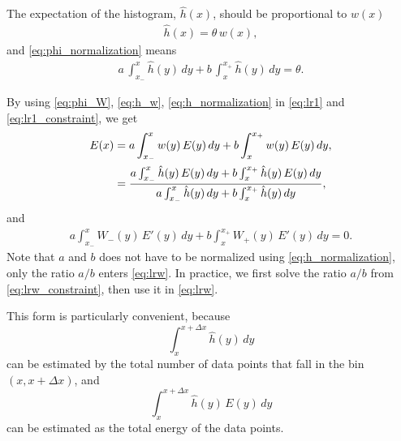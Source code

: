 \documentclass[12pt]{article}
\begin{document}
The expectation of the histogram, $\hat h(x)$, should be proportional to $w(x)$
\begin{align}
  \hat h(x) = \theta \, w(x),
  \label{eq:h_w}
\end{align}
and \eqref{eq:phi_normalization} means
\begin{align}
  a \, \int_{x_-}^x \hat h(y) \, dy
+
  b \, \int_x^{x_+} \hat h(y) \, dy
=
  \theta.
  \label{eq:h_normalization}
\end{align}


By using \eqref{eq:phi_W}, \eqref{eq:h_w}, \eqref{eq:h_normalization}
in \eqref{eq:lr1} and \eqref{eq:lr1_constraint},
we get
\begin{align}
  E(x)
&=
  a \int_{x_{-}}^x w(y) \, E(y) \, dy
+
  b \int_x^{x_{+}} w(y) \, E(y) \, dy,
\notag
\\
&=
\frac{
  a \int_{x_{-}}^x \hat h(y) \, E(y) \, dy
+
  b \int_x^{x_{+}} \hat h(y) \, E(y) \, dy
}
{
  a \int_{x_{-}}^x \hat h(y) \, dy
+
  b \int_x^{x_{+}} \hat h(y) \, dy
},
\label{eq:lrw}
\end{align}
and
\begin{align}
  a \int_{x_{-}}^x W_-(y) \, E'(y) \, dy
+
  b \int_x^{x_{+}} W_+(y) \, E'(y) \, dy
= 0.
\label{eq:lrw_constraint}
\end{align}
%
Note that $a$ and $b$ does not have to be
normalized using \eqref{eq:h_normalization},
only the ratio $a/b$ enters \eqref{eq:lrw}.
%
In practice, we first solve the ratio $a/b$ from \eqref{eq:lrw_constraint},
then use it in \eqref{eq:lrw}.

This form is particularly convenient, because
\[
  \int_x^{x+\Delta x} \hat h(y) \, dy
\]
can be estimated by the total number of data points
that fall in the bin $(x, x + \Delta x)$,
and
\[
  \int_x^{x+\Delta x} \hat h(y) \, E(y) \, dy
\]
can be estimated as the total energy of the data points.
\end{document}
